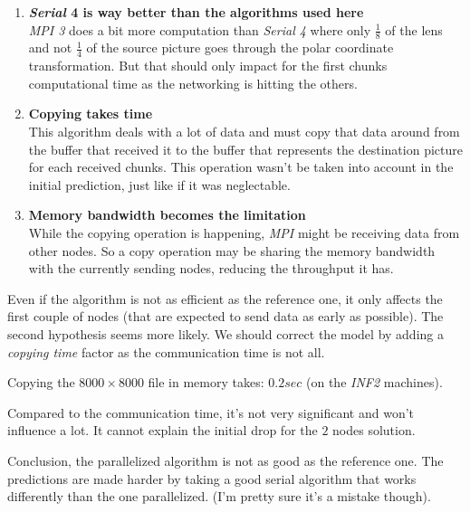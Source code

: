 \documentclass[10pt,a4paper]{article}
\begin{document}
\begin{enumerate}
    \item \textbf{\emph{Serial} 4 is way better than the algorithms used here}  \\

    \emph{MPI 3} does a bit more computation than \emph{Serial 4} where only
    $\frac{1}{8}$ of the lens and not $\frac{1}{4}$ of the source picture goes
    through the polar coordinate transformation. But that should only impact
    for the first chunks computational time as the networking is hitting the
    others.

    \item \textbf{Copying takes time} \\

    This algorithm deals with a lot of data and must copy that data around from
    the buffer that received it to the buffer that represents the destination
    picture for each received chunks. This operation wasn't be taken into
    account in the initial prediction, just like if it was neglectable.

    \item \textbf{Memory bandwidth becomes the limitation} \\

    While the copying operation is happening, \emph{MPI} might be receiving
    data from other nodes. So a copy operation may be sharing the memory
    bandwidth with the currently sending nodes, reducing the throughput it has.

\end{enumerate}

Even if the algorithm is not as efficient as the reference one, it only affects
the first couple of nodes (that are expected to send data as early as possible).
The second hypothesis seems more likely. We should correct the model by adding
a \emph{copying time} factor as the communication time is not all.

Copying the $8000 \times 8000$ file in memory takes: $0.2 sec$ (on the
\emph{INF2} machines).

Compared to the communication time, it's not very significant and won't
influence a lot. It cannot explain the initial drop for the $2$ nodes solution.

Conclusion, the parallelized algorithm is not as good as the reference one.
The predictions are made harder by taking a good serial algorithm that works
differently than the one parallelized. (I'm pretty sure it's a mistake though).
\end{document}

